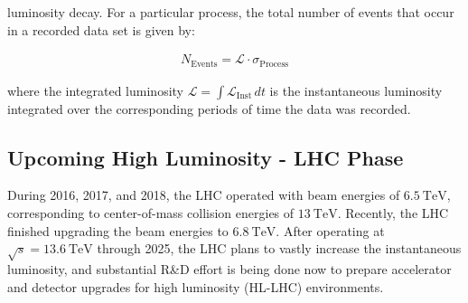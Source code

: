 luminosity decay.
For a particular process, the total number of events that occur in a recorded data set is given by:
\begin{linenomath*}
\begin{align}
N_{\text {Events}}= \mathcal{L} \cdot \sigma_{\text{Process}}
\end{align}
\end{linenomath*}
where the integrated luminosity $\mathcal{L} = \int \mathcal{L}_{\text{Inst}} \,dt$ is the instantaneous luminosity integrated over the corresponding periods of time the data was recorded.

\subsection{Upcoming High Luminosity - LHC Phase}
During 2016, 2017, and 2018, the LHC operated with beam energies of $\SI{6.5}{\TeV}$, corresponding to center-of-mass collision energies of $\SI{13}{\TeV}$.
Recently, the LHC finished upgrading the beam energies to $\SI{6.8}{\TeV}$.
After operating at $\sqrt{s}=\SI{13.6}{\TeV}$ through 2025, the LHC plans to vastly increase the instantaneous luminosity, and substantial R\&D effort is being done now to prepare accelerator and detector upgrades for high luminosity (HL-LHC) environments.


